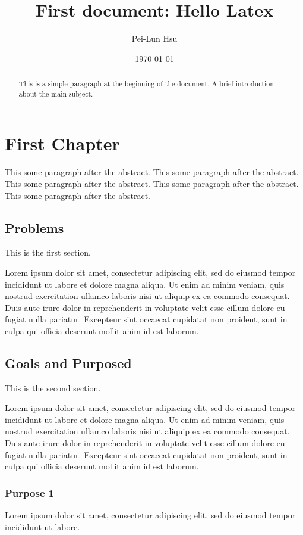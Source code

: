 \documentclass[12pt, a4paper]{report}
\title{First document: Hello Latex}
\author{Pei-Lun Hsu}
\date{\today}
\begin{document}
\maketitle

\begin{abstract}
    This is a simple paragraph at the beginning of the document. A brief introduction about the main subject.
\end{abstract}

\tableofcontents

\chapter{First Chapter}
This some paragraph after the abstract. This some paragraph after the abstract. This some paragraph after the abstract. This some paragraph after the abstract. This some paragraph after the abstract.

\section{Problems}
This is the first section.

Lorem ipsum dolor sit amet, consectetur adipiscing elit, sed do eiusmod tempor incididunt ut labore et dolore magna aliqua. Ut enim ad minim veniam, quis nostrud exercitation ullamco laboris nisi ut aliquip ex ea commodo consequat. Duis aute irure dolor in reprehenderit in voluptate velit esse cillum dolore eu fugiat nulla pariatur. Excepteur sint occaecat cupidatat non proident, sunt in culpa qui officia deserunt mollit anim id est laborum.

\section{Goals and Purposed}
This is the second section.

Lorem ipsum dolor sit amet, consectetur adipiscing elit, sed do eiusmod tempor incididunt ut labore et dolore magna aliqua. Ut enim ad minim veniam, quis nostrud exercitation ullamco laboris nisi ut aliquip ex ea commodo consequat. Duis aute irure dolor in reprehenderit in voluptate velit esse cillum dolore eu fugiat nulla pariatur. Excepteur sint occaecat cupidatat non proident, sunt in culpa qui officia deserunt mollit anim id est laborum.

\subsection{Purpose 1}
Lorem ipsum dolor sit amet, consectetur adipiscing elit, sed do eiusmod tempor incididunt ut labore.
\end{document}
